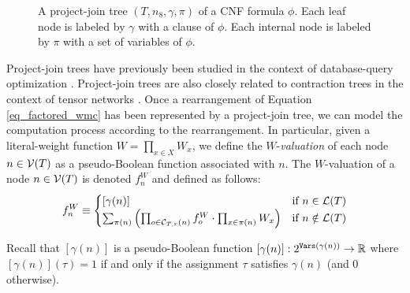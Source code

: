 \begin{figure}%
    \centering
\caption{
    A project-join tree $(T, n_{8}, \gamma, \pi)$ of a CNF formula $\phi$.
    Each leaf node is labeled by $\gamma$ with a clause of $\phi$.
    Each internal node is labeled by $\pi$ with a set of variables of $\phi$.
}
\label{fig_join_tree}
\end{figure}

Project-join trees have previously been studied in the context of database-query optimization \cite{MPPV04}.
Project-join trees are also closely related to contraction trees in the context of tensor networks \cite{EP14,DDV19}.
Once a rearrangement of Equation \eqref{eq_factored_wmc} has been represented by a project-join tree, we can model the computation process according to the rearrangement.
In particular, given a literal-weight function $W = \prod_{x \in X} W_x$, we define the $W$-\emph{valuation} of each node $n \in \mathcal{V}(T)$ as a pseudo-Boolean function associated with $n$.
The $W$-valuation of a node $n \in \mathcal{V}(T)$ is denoted $f^W_n$ and defined as follows:
\begin{equation}
\label{eq_valuation}
    f^W_n \equiv
    \begin{cases}
       [\gamma(n)] & \text{if}~n \in \mathcal{L}(T) \\
        \sum_{\pi(n)} \left(  \prod_{o \in \mathcal{C}_{T,r}(n)} f^W_o \cdot \prod_{x \in \pi(n)} W_x  \right) & \text{if}~n \notin \mathcal{L}(T)
    \end{cases}
\end{equation}

Recall that $[\gamma(n)]$ is a pseudo-Boolean function $[\gamma(n)] : 2^{\texttt{\upshape Vars}(\gamma(n))} \rightarrow \mathbb{R}$ where $[\gamma(n)](\tau) = 1$ if and only if the assignment $\tau$ satisfies $\gamma(n)$ (and 0 otherwise). 

